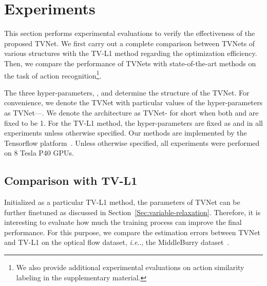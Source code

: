 \documentclass[10pt,twocolumn,letterpaper]{article}
\makeatletter
\DeclareRobustCommand\onedot{\futurelet\@let@token\@onedot}
\def\@onedot{\ifx\@let@token.\else.\null\fi\xspace}
\def\ie{\emph{i.e}\onedot} \def\Ie{\emph{I.e}\onedot}
\makeatother
\begin{document}
 \section{Experiments}

This section performs experimental evaluations to verify the effectiveness of the proposed TVNet. We first carry out a complete comparison between TVNets of various structures with the TV-L1 method regarding the optimization efficiency.
Then, we compare the performance of TVNets with state-of-the-art methods on the task of action recognition\footnote{We also provide additional experimental evaluations on action similarity labeling in the supplementary material.}. 

The three hyper-parameters, ,  and  determine the structure of the TVNet.
For convenience, we denote the TVNet with particular values of the hyper-parameters as TVNet---. We denote the architecture as TVNet- for short when both  and  are fixed to be 1.
For the TV-L1 method, the hyper-parameters are fixed as  and  in all experiments unless otherwise specified.
Our methods are implemented by the Tensorflow platform~\cite{abadi2016tensorflow}. Unless otherwise specified, all experiments were performed on 8 Tesla P40 GPUs.


\subsection{Comparison with TV-L1}

Initialized as a particular TV-L1 method, the parameters of TVNet can be further finetuned as discussed in Section~\ref{Sec:variable-relaxation}. Therefore, it is interesting to evaluate how much the training process can improve the final performance. For this purpose, we compare the estimation errors between TVNet and TV-L1 on the optical flow dataset, \ie, the MiddleBurry dataset~\cite{baker2011database}.
\end{document}
